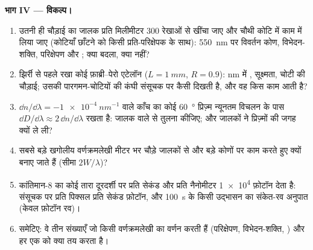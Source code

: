 \begin{problem}
\medskip
\noindent\textbf{भाग IV --- विकल्प।}
\begin{enumerate}[resume]
  \item उतनी ही चौड़ाई का जालक प्रति मिलीमीटर $300$ रेखाओं से खींचा जाए और
        चौथी कोटि में काम में लिया जाए (कोटियाँ छाँटने को किसी प्रति-परिक्षेपक के साथ):
        \qty{550}{nm} पर विवर्तन कोण, विभेदन-शक्ति, परिक्षेपण और ; क्या बदला, क्या नहीं?
  \item झिर्री से पहले रखा कोई फ़ाब्री--पेरो एटेलॉन ($L = \qty{1}{mm}$, $R = 0.9$):
        nm में , सूक्ष्मता, चोटी की चौड़ाई; उसकी
        पारगमन-चोटियों की कंघी संसूचक पर कैसी दिखती है,
        और वह किस काम आती है?
  \item $\dd n/\dd\lambda = \qty{-1e-4}{nm^{-1}}$ वाले काँच का कोई \qty{60}{\degree} प्रिज़्म
        न्यूनतम विचलन के पास  $\dd D/\dd\lambda \approx 2\,\dd n/\dd\lambda$
        रखता है: जालक वाले से तुलना कीजिए; और जालकों ने प्रिज़्मों की जगह
        क्यों ले ली?
  \item सबसे बड़े खगोलीय वर्णक्रमलेखी मीटर भर चौड़े जालकों से और बड़े
        कोणों पर काम करते हुए क्यों बनाए जाते हैं (सीमा
        $2W/\lambda$)?
  \item कांतिमान-8 का कोई तारा दूरदर्शी पर प्रति सेकंड और प्रति
        नैनोमीटर \qty{1e4}{} फ़ोटॉन देता है: संसूचक पर प्रति पिक्सल प्रति सेकंड
        फ़ोटॉन, और \qty{100}{s} के किसी उद्भासन का संकेत-रव अनुपात
        (केवल फ़ोटॉन रव)।
  \item समेटिए: वे तीन संख्याएँ जो किसी वर्णक्रमलेखी का वर्णन करती हैं
        (परिक्षेपण, विभेदन-शक्ति, ) और हर एक को क्या
        तय करता है।
\end{enumerate}
\end{problem}
